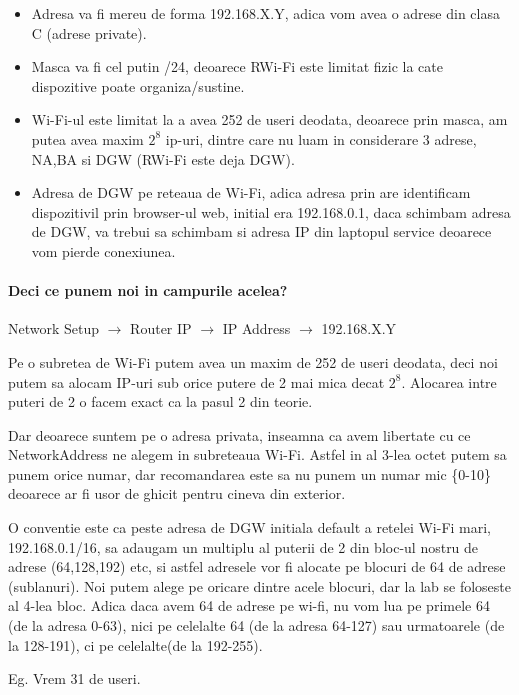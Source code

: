 \documentclass{article}
\begin{document}
\begin{itemize}
    \item[1] Adresa va fi mereu de forma 192.168.X.Y, adica vom avea o adrese din clasa C (adrese private).
    \item[2] Masca va fi cel putin /24, deoarece RWi-Fi este limitat fizic la cate dispozitive poate organiza/sustine.
    \item[3] Wi-Fi-ul este limitat la a avea 252 de useri deodata, deoarece prin masca, am putea avea maxim $2^8$ ip-uri, dintre care nu luam in considerare 3 adrese, NA,BA si DGW (RWi-Fi este deja DGW).
    \item[4] Adresa de DGW pe reteaua de Wi-Fi, adica adresa prin are identificam dispozitivil prin browser-ul web, initial era 192.168.0.1, daca schimbam adresa de DGW, va trebui sa schimbam si adresa IP din laptopul service deoarece vom pierde conexiunea.
\end{itemize}

\paragraph{Deci ce punem noi in campurile acelea?}

Network Setup $\rightarrow$ Router IP $\rightarrow$ IP Address $\rightarrow$ 192.168.X.Y

Pe o subretea de Wi-Fi putem avea un maxim de 252 de useri deodata, deci noi putem sa alocam IP-uri sub orice putere de 2 mai mica decat $2^8$. Alocarea intre puteri de 2 o facem exact ca la pasul 2 din teorie.

Dar deoarece suntem pe o adresa privata, inseamna ca avem libertate cu ce NetworkAddress ne alegem in subreteaua Wi-Fi. Astfel in al 3-lea octet putem sa punem orice numar, dar recomandarea este sa nu punem un numar mic \{0-10\} deoarece ar fi usor de ghicit pentru cineva din exterior.

O conventie este ca peste adresa de DGW initiala default a retelei Wi-Fi mari, 192.168.0.1/16, sa adaugam un multiplu al puterii de 2 din bloc-ul nostru de adrese (64,128,192) etc, si astfel adresele vor fi alocate pe blocuri de 64 de adrese (sublanuri). Noi putem alege pe oricare dintre acele blocuri, dar la lab se foloseste al 4-lea bloc. Adica daca avem 64 de adrese pe wi-fi, nu vom lua pe primele 64 (de la adresa 0-63), nici pe celelalte 64 (de la adresa 64-127) sau urmatoarele (de la 128-191), ci pe celelalte(de la 192-255).

\newpage
Eg. Vrem 31 de useri.
\end{document}
